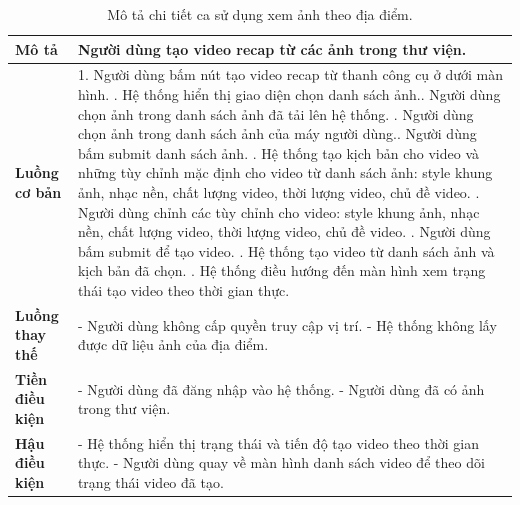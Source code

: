 \noindent 
\begin{xltabular}{\linewidth}{| l | X |} 
\caption{Mô tả chi tiết ca sử dụng xem ảnh theo địa điểm.}
\label{tab:create-video-recap-usecase}\\
\hline 
\textbf{Mô tả} & Người dùng tạo video recap từ các ảnh trong thư viện. \\
\hline 
\textbf{Luồng cơ bản} & 1. Người dùng bấm nút tạo video recap từ thanh công cụ ở dưới màn hình. . Hệ thống hiển thị giao diện chọn danh sách ảnh.. Người dùng chọn ảnh trong danh sách ảnh đã tải lên hệ thống. . Người dùng chọn ảnh trong danh sách ảnh của máy người dùng.. Người dùng bấm submit danh sách ảnh. . Hệ thống tạo kịch bản cho video và những tùy chỉnh mặc định cho video từ danh sách ảnh: style khung ảnh, nhạc nền, chất lượng video, thời lượng video, chủ đề video. . Người dùng chỉnh các tùy chỉnh cho video: style khung ảnh, nhạc nền, chất lượng video, thời lượng video, chủ đề video. . Người dùng bấm submit để tạo video. . Hệ thống tạo video từ danh sách ảnh và kịch bản đã chọn. . Hệ thống điều hướng đến màn hình xem trạng thái tạo video theo thời gian thực. \\
\hline
\textbf{Luồng thay thế} & - Người dùng không cấp quyền truy cập vị trí. \newline
                          - Hệ thống không lấy được dữ liệu ảnh của địa điểm. \\
\hline
\textbf{Tiền điều kiện} & - Người dùng đã đăng nhập vào hệ thống. \newline
                            - Người dùng đã có ảnh trong thư viện. \\
\hline
\textbf{Hậu điều kiện} & - Hệ thống hiển thị trạng thái và tiến độ tạo video theo thời gian thực. \newline
                         - Người dùng quay về màn hình danh sách video để theo dõi trạng thái video đã tạo. \\
\hline 
\end{xltabular}


